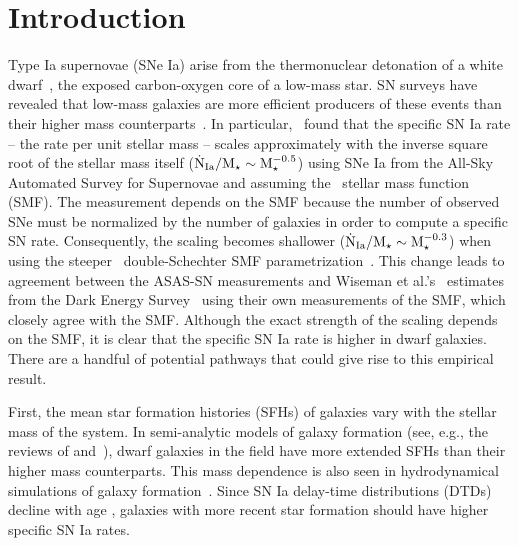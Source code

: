 \documentclass[foo.tex]{subfiles}
\begin{document}
\section{Introduction}
\label{sec:intro}

Type Ia supernovae (SNe Ia) arise from the thermonuclear detonation of a white
dwarf~\citep[WD;][]{Hoyle1960, Colgate1969}, the exposed carbon-oxygen core of
a low-mass star.
SN surveys have revealed that low-mass galaxies are more efficient producers
of these events than their higher mass counterparts~\citep[e.g.,][]{Mannucci2005,
Sullivan2006, Li2011, Smith2012}.
In particular,~\citet{Brown2019} found that the specific SN Ia rate -- the rate
per unit stellar mass -- scales approximately with the inverse square root of
the stellar mass itself ($\dot{\text{N}}_\text{Ia} / \text{M}_\star \sim \text{M}_\star^{-0.5}$)
using SNe Ia from the All-Sky Automated Survey for Supernovae
\citep[ASAS-SN;][]{Shappee2014, Kochanek2017} and assuming the~\citet{Bell2003}
stellar mass function (SMF).
The measurement depends on the SMF because the number of
observed SNe must be normalized by the number of galaxies in order to compute a
specific SN rate.
Consequently, the scaling becomes shallower ($\dot{\text{N}}_\text{Ia} / \text{M}_\star
\sim \text{M}_\star^{-0.3}$) when using the steeper~\citet{Baldry2012} double-Schechter
SMF parametrization~\citep{Gandhi2022}.
This change leads to agreement between the ASAS-SN measurements and Wiseman et
al.'s~\citeyearpar{Wiseman2021} estimates from the Dark Energy
Survey~\citep[DES;][]{DES2016} using 
{\color{red}
their own measurements of the SMF, which closely agree with the
\citet{Baldry2012} SMF.
}
Although the exact strength of the scaling depends on the SMF, it is clear
that the specific SN Ia rate is higher in dwarf galaxies.
There are a handful of potential pathways that could give rise to this
empirical result.
\par
First, the mean star formation histories (SFHs) of galaxies vary with the
stellar mass of the system.
In semi-analytic models of galaxy formation (see, e.g., the reviews of
\citealt{Baugh2006} and~\citealt{Somerville2015a}), dwarf galaxies in the field
have more extended SFHs than their higher mass counterparts.
This mass dependence is also seen in hydrodynamical simulations of galaxy
formation~\citep[e.g.,][]{GarrisonKimmel2019}.
Since SN Ia delay-time distributions (DTDs) decline with age
\citep[e.g.,][]{Greggio2005, Maoz2012a}, galaxies with more recent star
formation should have higher specific SN Ia rates.
\par
\end{document}
